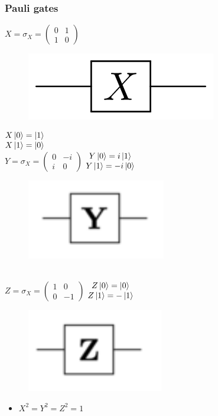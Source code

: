 \documentclass[11.5pt, paper=a4]{article}
\theoremstyle{definition}
\numberwithin{theorem}{section}
\begin{document}
\subsubsection{Pauli gates}
    $X = \sigma_{X} = \begin{pmatrix}
    0 & 1\\
    1 & 0
    \end{pmatrix}$
    \begin{figure}[h]
        \includegraphics[scale=0.15]{download.png}
    \end{figure}
    $\begin{matrix}
    X\ket{0} = \ket{1}\\
    X\ket{1} = \ket{0}
    \end{matrix}$ \\
    $Y = \sigma_{X} = \begin{pmatrix}
    0 & -i\\
    i & 0
    \end{pmatrix}$ $\begin{matrix}
    Y\ket{0} = i\ket{1}\\
    Y\ket{1} = -i\ket{0}
    \end{matrix}$
    \begin{figure}[h]
        \includegraphics[scale=0.2]{Y gate.png}
    \end{figure} \\
    $Z = \sigma_{X} = \begin{pmatrix}
    1 & 0\\
    0 & -1
    \end{pmatrix}$ $\begin{matrix}
    Z\ket{0} = \ket{0}\\
    Z\ket{1} = -\ket{1}
    \end{matrix}$
    \begin{figure}[h]
        \includegraphics[scale=0.2]{Z gate.png}
    \end{figure}
    \begin{itemize}
        \item $ X^{2} = Y^{2} = Z^{2} = 1 $
    \end{itemize}
\end{document}
